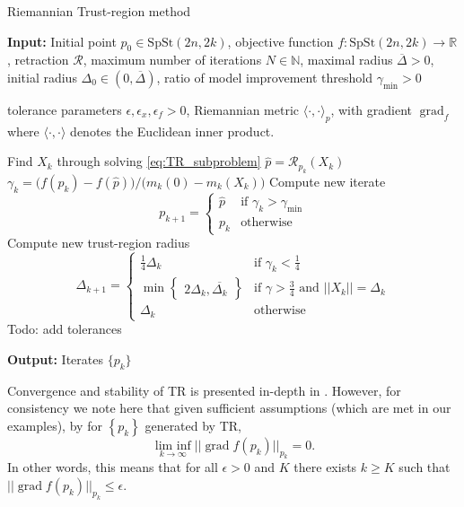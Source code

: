 \begin{algorithm}[H]
    \caption{Riemannian Trust-region method}\label{alg:grad_descent}
    \textbf{Input:} Initial point $p_{0}\in \mathrm{SpSt}(2n, 2k)$, objective function $f\colon\mathrm{SpSt}(2n, 2k)\to \mathbb{R}$, retraction $\mathcal{R}$, maximum number of iterations $N\in \mathbb{N}$,  maximal radius $\overline{\Delta}>0$, initial radius $\Delta_{0}\in(0,\overline{\Delta})$, ratio of model improvement threshold $\gamma_{\text{min}}>0$

    tolerance parameters $\epsilon, \epsilon_{x}, \epsilon_{f}>0$, Riemannian metric $\langle \cdot,\cdot \rangle_{p}$, with gradient $\operatorname*{grad}_{f}$ where $\langle \cdot,\cdot \rangle$ denotes the Euclidean inner product.
    \begin{algorithmic}[1]
        \State Find $X_{k}$ through solving \eqref{eq:TR_subproblem}
        \State $\hat{p}=\mathcal{R}_{p_{k}}(X_{k})$
        \State $\gamma_{k}=\big(f(p_{k})-f(\hat{p})\big)/\big(m_{k}(0)-m_{k}(X_{k})\big)$
        \State Compute new iterate\begin{equation*}
            p_{k+1}=
            \begin{cases}
            \hat{p} & \text{if }\gamma_{k}>\gamma_{\text{min}} \\
            p_{k}  & \text{otherwise}
            \end{cases}
            \end{equation*}
        \State Compute new trust-region radius\begin{equation*}
    \Delta_{k+1}=
    \begin{cases}
    \frac{1}{4}\Delta_{k} & \text{if }\gamma_{k}<\frac{1}{4} \\
    \operatorname{min}\begin{Bmatrix}2\Delta_{k},\overline{\Delta_{k}}\end{Bmatrix} & \text{if }\gamma>\frac{3}{4}\text{ and }\lvert \lvert X_{k} \rvert  \rvert =\Delta_{k} \\
    \Delta_{k} & \text{otherwise}
    \end{cases}
    \end{equation*}
        \State Todo: add tolerances
    \EndFor
    \end{algorithmic}
    \textbf{Output:} Iterates $\{p_{k}\}$
\end{algorithm}

Convergence and stability of TR is presented in-depth in \cite[p.~147]{Boumal2023}. However, for consistency we note here that given sufficient assumptions (which are met in our examples), by \cite[Cor.~6.24]{Boumal2023} for $\left\{ p_{k} \right\}$ generated by TR,
%
\begin{equation*}
\operatorname*{lim~inf}_{ k \to \infty }\lvert \lvert \operatorname{grad}f(p_{k}) \rvert  \rvert _{p_{k}}=0.
\end{equation*}
%
In other words, this means that for all $\epsilon>0$ and $K$ there exists $k\geq K$ such that $\lvert \lvert \operatorname{grad}f(p_{k}) \rvert \rvert_{p_{k}}\leq\epsilon$. 